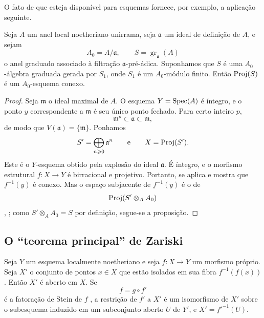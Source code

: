 O fato de que  esteja disponível para esquemas fornece,
por exemplo, a aplicação seguinte.

\begin{proposition}[4.3.13]
\label{III.4.3.13}
Seja $A$ um anel local noetheriano unirrama, seja $\mathfrak{a}$ um
ideal de definição de $A$, e sejam
\[
  A_0=A/\mathfrak{a},
  \qquad
  S=\operatorname{gr}_{\mathfrak{a}}(A)
\]
o anel graduado associado à filtração $\mathfrak{a}$-pré-ádica.
Suponhamos que $S$ é uma $A_0$-álgebra graduada gerada por $S_1$,
onde $S_1$ é um $A_0$-módulo finito. Então $\operatorname{Proj}(S)$ é um
$A_0$-esquema conexo.
\end{proposition}

\begin{proof}
Seja $\mathfrak{m}$ o ideal maximal de $A$. O esquema
$Y=\operatorname{Spec}(A)$ é íntegro, e o ponto $y$ correspondente a
$\mathfrak{m}$ é seu único ponto fechado. Para certo inteiro $p$,
\[
  \mathfrak{m}^p\subset\mathfrak{a}\subset\mathfrak{m},
\]
de modo que $V(\mathfrak{a})=\{\mathfrak{m}\}$. Ponhamos
\[
  S'=\bigoplus_{n\geqslant0}\mathfrak{a}^n
  \qquad\text{e}\qquad
  X=\operatorname{Proj}(S').
\]
Este é o $Y$-esquema obtido pela explosão do ideal
$\mathfrak{a}$. É íntegro, e o morfismo estrutural
$f:X\to Y$ é birracional  e projetivo.
Portanto,  se aplica e mostra que $f^{-1}(y)$ é
conexo. Mas o espaço subjacente de $f^{-1}(y)$ é o de
\[
  \operatorname{Proj}(S'\otimes_A A_0)
\]
, ; como
$S'\otimes_AA_0=S$ por definição, segue-se a proposição.
\end{proof}


\subsection{O ``teorema principal'' de Zariski}
\label{subsection:III.4.4}

\begin{proposition}[4.4.1]
\label{III.4.4.1}
Seja $Y$ um esquema localmente noetheriano e seja $f:X\to Y$ um
morfismo próprio. Seja $X'$ o conjunto de pontos $x\in X$ que estão
isolados em sua fibra $f^{-1}(f(x))$. Então $X'$ é aberto em $X$.
Se
\[
  f=g\circ f'
\]
é a fatoração de Stein de $f$ , a restrição
de $f'$ a $X'$ é um isomorfismo de $X'$ sobre o subesquema induzido
em um subconjunto aberto $U$ de $Y'$, e
$X'=f'^{-1}(U)$.
\end{proposition}

